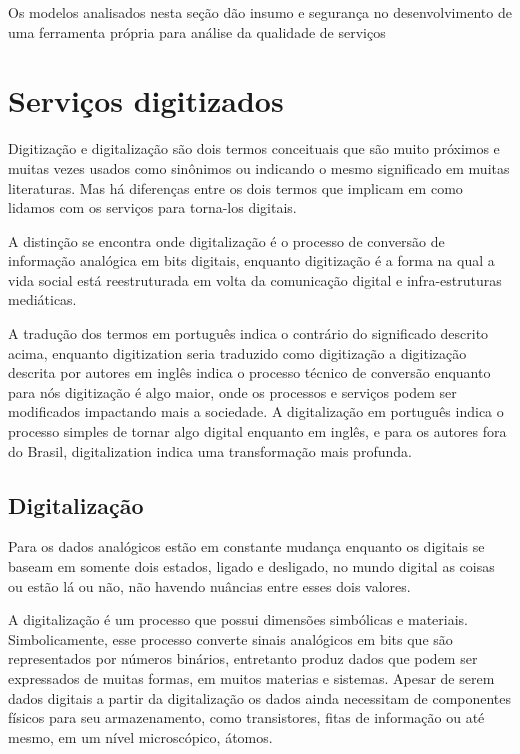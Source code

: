 Os modelos analisados nesta seção dão insumo e segurança no desenvolvimento de uma ferramenta própria para análise da qualidade de serviços

\section{Serviços digitizados}

Digitização e digitalização são dois termos conceituais que são muito próximos e muitas vezes usados como sinônimos ou indicando o mesmo significado em muitas literaturas. Mas há diferenças entre os dois termos que implicam em como lidamos com os serviços para torna-los digitais.

A distinção se encontra onde digitalização é o processo de conversão de informação analógica em bits digitais, enquanto digitização é a forma na qual a vida social está reestruturada em volta da comunicação digital e infra-estruturas mediáticas.

A tradução dos termos em português indica o contrário do significado descrito acima, enquanto digitization seria traduzido como digitização a digitização descrita por autores em inglês indica o processo técnico de conversão enquanto para nós digitização é algo maior, onde os processos e serviços podem ser modificados impactando mais a sociedade. A digitalização em português indica o processo simples de tornar algo digital enquanto em inglês, e para os autores fora do Brasil, digitalization indica uma transformação mais profunda.

\subsection{Digitalização}

Para \cite[p.~02]{feldman1997} os dados analógicos estão em constante mudança enquanto os digitais se baseam em somente dois estados, ligado e desligado, no mundo digital as coisas ou estão lá ou não, não havendo nuâncias entre esses dois valores. 

A digitalização é um processo que possui dimensões simbólicas e materiais. Simbolicamente, esse processo converte sinais analógicos em bits que são representados por números binários, entretanto produz dados que podem ser expressados de muitas formas, em muitos materias e sistemas. Apesar de serem dados digitais a partir da digitalização os dados ainda necessitam de componentes físicos para seu armazenamento, como transistores, fitas de informação ou até mesmo, em um nível microscópico, átomos. 

